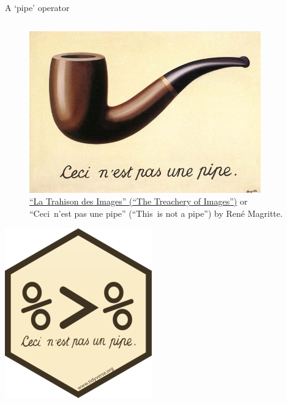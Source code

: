 \documentclass[
  11pt,
  ignorenonframetext,
]{beamer}
\begin{document}
\begin{frame}{A `pipe' operator}
\protect\hypertarget{a-pipe-operator}{}
\begin{columns}[c,onlytextwidth]
\begin{column}{0.38\textwidth}
\begin{figure}
\centering
\includegraphics{images/MagrittePipe.jpg}
\caption{\href{https://en.wikipedia.org/wiki/The_Treachery_of_Images}{``La
Trahison des Images'' (``The Treachery of Images'')} or ``Ceci~n'est pas
une pipe'' (``This~is not a pipe'') by René Magritte. }
\end{figure}

\centering

\href{https://magrittr.tidyverse.org/}{\includegraphics[width=\textwidth,height=0.25\textheight]{images/magrittr_logo.png}}
\end{column}


\end{columns}
\end{frame}
\end{document}
